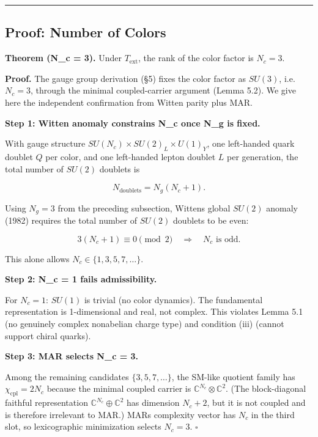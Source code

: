 \begin{center}\rule{0.5\linewidth}{0.5pt}\end{center}

\subsection{Proof: Number of Colors}\label{7-proof-number-of-colors}

\textbf{Theorem (N\_c = 3).} Under \(T_{\mathrm{ext}}\), the rank of the color factor is \(N_c = 3\).

\textbf{Proof.} The gauge group derivation (\S{}5) fixes the color factor as \(SU(3)\), i.e. \(N_c = 3\), through the minimal coupled-carrier argument (Lemma 5.2). We give here the independent confirmation from Witten parity plus MAR.

\textbf{Step 1: Witten anomaly constrains N\_c once N\_g is fixed.}

With gauge structure \(SU(N_c) \times SU(2)_L \times U(1)_Y\), one left-handed quark doublet \(Q\) per color, and one left-handed lepton doublet \(L\) per generation, the total number of \(SU(2)\) doublets is

\[N_{\mathrm{doublets}} = N_g(N_c + 1).\]

Using \(N_g = 3\) from the preceding subsection, Witten\textquotesingle s global \(SU(2)\) anomaly (1982) requires the total number of \(SU(2)\) doublets to be even:

\[3(N_c + 1) \equiv 0 \pmod{2} \quad \Longrightarrow \quad N_c \text{ is odd}.\]

This alone allows \(N_c \in \{1, 3, 5, 7, \ldots\}\).

\textbf{Step 2: N\_c = 1 fails admissibility.}

For \(N_c = 1\): \(SU(1)\) is trivial (no color dynamics). The fundamental representation is 1-dimensional and real, not complex. This violates Lemma 5.1 (no genuinely complex nonabelian charge type) and condition (iii) (cannot support chiral quarks).

\textbf{Step 3: MAR selects N\_c = 3.}

Among the remaining candidates \(\{3, 5, 7, \ldots\}\), the SM-like quotient family has \(\chi_{\mathrm{cpl}} = 2N_c\) because the minimal coupled carrier is \(\mathbb{C}^{N_c} \otimes \mathbb{C}^2\). (The block-diagonal faithful representation \(\mathbb{C}^{N_c} \oplus \mathbb{C}^2\) has dimension \(N_c + 2\), but it is not coupled and is therefore irrelevant to MAR.) MAR\textquotesingle s complexity vector has \(N_c\) in the third slot, so lexicographic minimization selects \(N_c = 3\). \(\square\)


